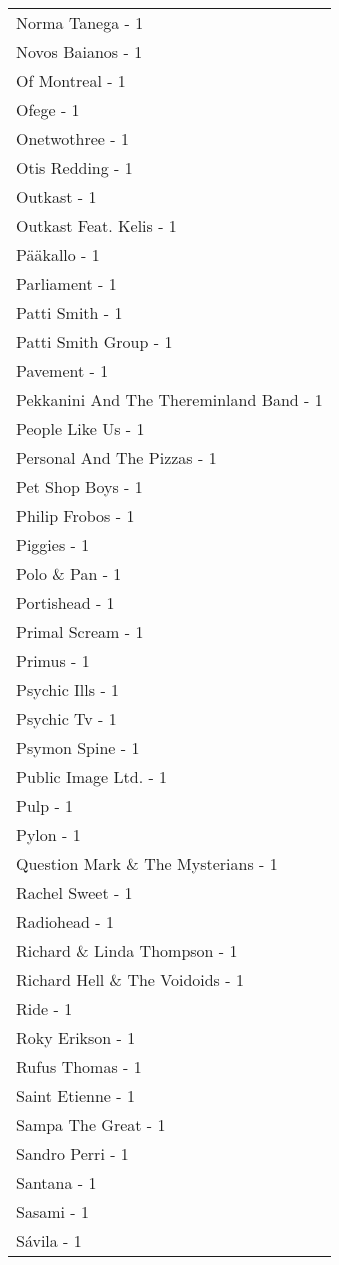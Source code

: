 \documentclass[
]{article}
\begin{document}
\begin{longtable}{l}
Norma Tanega - 1 \\ 
Novos Baianos - 1 \\ 
Of Montreal - 1 \\ 
Ofege - 1 \\ 
Onetwothree - 1 \\ 
Otis Redding - 1 \\ 
Outkast - 1 \\ 
Outkast Feat. Kelis - 1 \\ 
Pääkallo - 1 \\ 
Parliament - 1 \\ 
Patti Smith - 1 \\ 
Patti Smith Group - 1 \\ 
Pavement - 1 \\ 
Pekkanini And The Thereminland Band - 1 \\ 
People Like Us - 1 \\ 
Personal And The Pizzas - 1 \\ 
Pet Shop Boys - 1 \\ 
Philip Frobos - 1 \\ 
Piggies - 1 \\ 
Polo \& Pan - 1 \\ 
Portishead - 1 \\ 
Primal Scream - 1 \\ 
Primus - 1 \\ 
Psychic Ills - 1 \\ 
Psychic Tv - 1 \\ 
Psymon Spine - 1 \\ 
Public Image Ltd. - 1 \\ 
Pulp - 1 \\ 
Pylon - 1 \\ 
Question Mark \& The Mysterians - 1 \\ 
Rachel Sweet - 1 \\ 
Radiohead - 1 \\ 
Richard \& Linda Thompson - 1 \\ 
Richard Hell \& The Voidoids - 1 \\ 
Ride - 1 \\ 
Roky Erikson - 1 \\ 
Rufus Thomas - 1 \\ 
Saint Etienne - 1 \\ 
Sampa The Great - 1 \\ 
Sandro Perri - 1 \\ 
Santana - 1 \\ 
Sasami - 1 \\ 
Sávila - 1 \\ 

\end{longtable}
\end{document}
